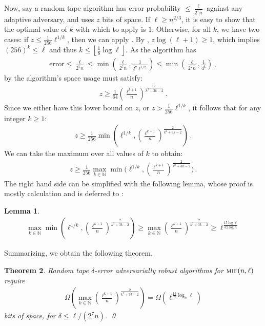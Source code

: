 \documentclass[10pt,a4paper]{article}
\newtheorem{theorem}{Theorem}[section]
\newtheorem{lemma}[theorem]{Lemma}
\theoremstyle{definition}
\theoremstyle{remark}
\newcommand{\NN}{\mathbb{N}}
\newcommand{\floor}[1]{{\left\lfloor{#1}\right\rfloor}}
\newcommand{\mif}{\textsc{mif}\xspace}
\newcommand{\rl}{\mathbf{\ell}}             %
\begin{document}
\begin{itemize}
\begin{itemize}
Now, say a random tape algorithm has error probability $\le \frac{\rl}{2^{7} n}$ against any adaptive adversary, and uses $z$ bits of space. If $\rl \ge n^{2/3}$, it is easy to show that the optimal value of $k$ with which to apply  is $1$. Otherwise, for all $k$, we have two cases: if $z \le \frac{1}{256} \rl^{1/k}$, then we can apply . By , $z \log(\rl + 1) \ge 1$, which implies $(256)^k \le \rl$ and thus $k \le \floor{\frac{1}{8} \log \rl}$. As the algorithm has
\begin{align*}
  \text{error} \le \frac{\rl}{2^{7} n} \le \min(\frac{\rl}{2^{7} n}, \frac{1}{2^{7} \rl^{1/2}} ) \le \min(\frac{\rl}{2^{7} n}, \frac{1}{4^{k}}) \,,
\end{align*}
by  the algorithm's space usage must satisfy:
\begin{align*}
  z \ge \frac{1}{64} \left(\frac{\rl^{k + 1}}{n}\right)^{\frac{2}{k^2 + 3 k - 2}} \,.
\end{align*}
Since we either have this lower bound on $z$, or $z > \frac{1}{256} \rl^{1/k}$, it follows that for any integer $k \ge 1$:
\begin{align*}
  z \ge \frac{1}{256} \min\left(\rl^{1/k}, \left(\frac{\rl^{k + 1}}{n}\right)^{\frac{2}{k^2 + 3 k - 2}}\right)  \,.
\end{align*}
We can take the maximum over all values of $k$ to obtain:
\begin{align*}
  z \ge \frac{1}{256} \max_{k \in \NN} \min\Big(\rl^{1/k}, \left(\frac{\rl^{k + 1}}{n}\right)^{\frac{2}{k^2 + 3 k - 2}}\Big)  \,.
\end{align*}
The right hand side can be simplified with the following lemma, whose proof is mostly calculation and is deferred to :

\begin{lemma}\label{lem:rt-lb-calc-multiple}
  \begin{align}
    \max_{k \in \NN} \min\left(\rl^{1/k},\left(\frac{\rl^{k + 1}}{n}\right)^{\frac{2}{k^2 + 3 k - 2}}  \right) \ge  \max_{k \in \NN} \left(\frac{\rl^{k + 1}}{n}\right)^{\frac{2}{k^2 + 3 k - 2}}  \ge \rl^{\frac{15 \log \rl}{32 \log n}} \label{eq:rt-lb-max-min-lb}
  \end{align}
\end{lemma}

Summarizing, we obtain the following theorem.


\begin{theorem} %
\label{thm:rt-lb-intro}
  Random tape $\delta$-error adversarially robust algorithms for $\mif(n,\rl)$ require
  \begin{align*}
    \Omega\left(\max_{k \in \NN} \left(\frac{\rl^{k + 1}}{n}\right)^{\frac{2}{k^2 + 3 k - 2}}\right) 
    = \Omega\left(\rl^{\frac{15}{32} \log_{n} \rl}\right)
  \end{align*}
  bits of space, for $\delta \le \rl/(2^{7} n)$. \qed
\end{theorem}


\end{itemize}
\end{itemize}
\end{document}
